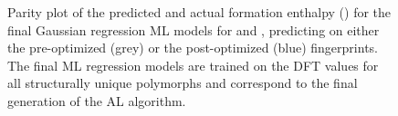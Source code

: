 \begin{figure}[!htb]
\centering
{}
\caption{\label{fig:parity}
%
Parity plot of the predicted and actual formation enthalpy (\DHf) for the final Gaussian regression ML models for \IrOtwo and \IrOthree,
predicting on either the pre-optimized (grey) or the post-optimized (blue) fingerprints.
%
The final ML regression models are trained on the DFT
\DHf values for all structurally unique polymorphs and correspond to the final generation of the AL algorithm.
}
\end{figure}


